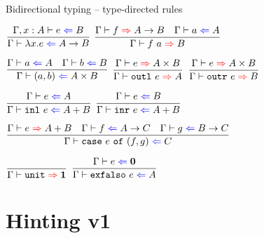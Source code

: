 \documentclass{beamer}
\newcommand{\Fun}[2]{#1 \to #2}
\newcommand{\Prod}[2]{#1 \times #2}
\newcommand{\Sum}[2]{#1 + #2}
\newcommand{\Unit}{\textbf{1}}
\newcommand{\Empty}{\textbf{0}}
\newcommand{\fun}[2]{\lambda #1. #2}
\newcommand{\app}[2]{#1\ #2}
\newcommand{\pair}[2]{(#1, #2)}
\newcommand{\outl}[1][]{\texttt{outl}\ #1}
\newcommand{\outr}[1][]{\texttt{outr}\ #1}
\newcommand{\inl}[1][]{\texttt{inl}\ #1}
\newcommand{\inr}[1][]{\texttt{inr}\ #1}
\newcommand{\case}[3]{\texttt{case}\ #1\ \texttt{of}\ (#2, #3)}
\newcommand{\unit}{\texttt{unit}}
\newcommand{\exfalso}[1][]{\texttt{exfalso}\ #1}
\newcommand{\infrule}[3][]{\displaystyle \frac{#2}{#3} \textsc{\footnotesize{#1}}}
\newcommand{\extend}[3]{#1, #2 : #3}
\begin{document}
\begin{frame}{Bidirectional typing -- type-directed rules}

\begin{center}
  $\infrule{\fullcheck{\extend{\Gamma}{x}{A}}{e}{B}}{\check{\fun{x}{e}}{\Fun{A}{B}}}$ \quad
  $\infrule{\infer{f}{\Fun{A}{B}} \quad \check{a}{A}}{\infer{\app{f}{a}}{B}}$

  \vspace{2em}

  $\infrule{\check{a}{A} \quad \check{b}{B}}{\check{\pair{a}{b}}{\Prod{A}{B}}}$ \quad
  $\infrule{\infer{e}{\Prod{A}{B}}}{\infer{\outl[e]}{A}}$ \quad
  $\infrule{\infer{e}{\Prod{A}{B}}}{\infer{\outr[e]}{B}}$

  \vspace{2em}

  $\infrule{\check{e}{A}}{\check{\inl[e]}{\Sum{A}{B}}}$ \quad
  $\infrule{\check{e}{B}}{\check{\inr[e]}{\Sum{A}{B}}}$

  \vspace{2em}

  $\infrule{\infer{e}{\Sum{A}{B}} \quad \check{f}{\Fun{A}{C}} \quad \check{g}{\Fun{B}{C}}}{\check{\case{e}{f}{g}}{C}}$

  \vspace{2em}

  $\infrule{}{\infer{\unit}{\Unit}}$ \quad
  $\infrule{\check{e}{\Empty}}{\check{\exfalso[e]}{A}}$
\end{center}

\end{frame}

\section{Hinting v1}

\newcommand{\fullhinting}[4]{#1 \vdash #2 \mathcolor{blue}{\Leftarrow} #3 \mathcolor{red}{\Rightarrow} #4}
\newcommand{\hinting}[3]{\fullhinting{\Gamma}{#1}{#2}{#3}}

\newcommand{\Hint}{\mathbf{?}}

\newcommand{\combinehints}[2]{#1 \sqcap #2}
\end{document}
